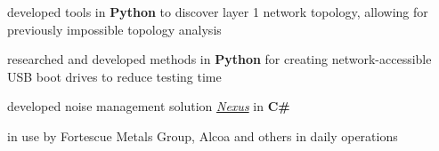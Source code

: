 \documentclass[a4paper]{style}
\begin{document}
\begin{minipage}[t]{0.54\textwidth}
\vspace{-1pt}
\begin{tightitemize}
    \item developed tools in \textbf{Python} to discover layer 1 network topology, allowing for previously impossible topology analysis
    \item researched and developed methods in \textbf{Python} for creating network-accessible USB boot drives to reduce testing time
\end{tightitemize}
\sectionspace{} %

\vspace{-1pt}
\begin{tightitemize}
    \item developed noise management solution \href{https://www.vanguardtech.com.au/products/nexus/}{\textit{Nexus}} in \textbf{C\#}
        \vspace{2pt}
        \begin{tightitemize}
            \item in use by Fortescue Metals Group, Alcoa and others in daily operations
        \end{tightitemize}
\end{tightitemize}

\sectionspace{}

\end{minipage} %
\hfill
%
%
\end{document}
